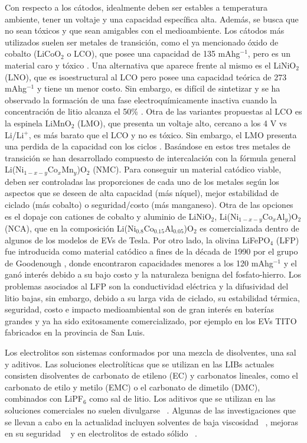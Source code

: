 Con respecto a los cátodos, idealmente deben ser estables a temperatura ambiente,
tener un voltaje y una capacidad específica alta. Además, se busca que no sean 
tóxicos y que sean amigables con el medioambiente. Los cátodos más utilizados 
suelen ser metales de transición, como el ya mencionado óxido de cobalto 
(LiCoO$_2$ o LCO), que posee una capacidad de 135 mAhg$^{-1}$, pero es un
material caro y tóxico \cite{akhilash2021}. Una alternativa que aparece frente
al mismo es el LiNiO$_2$ (LNO), que es isoestructural al LCO pero posee una
capacidad teórica de 273 mAhg$^{-1}$ y tiene un menor costo. Sin embargo, es
difícil de sintetizar y se ha observado la formación de una fase 
electroquímicamente inactiva cuando la concentración de litio alcanza el 50\% 
\cite{bianchini2019}. Otra de las variantes propuestas al LCO es la espinela
LiMnO$_2$ (LMO), que presenta un voltaje alto, cercano a los 4 V vs Li/Li$^+$,
es más barato que el LCO y no es tóxico. Sin embargo, el LMO presenta una 
perdida de la capacidad con los ciclos \cite{bhandari2016}. Basándose en estos 
tres metales de transición se han desarrollado compuesto de intercalación con 
la fórmula general Li(Ni$_{1-x-y}$Co$_x$Mn$_y$)O$_2$ (NMC). Para conseguir un 
material catódico viable, deben ser controladas las proporciones de cada uno de 
los metales según los aspectos que se deseen de alta capacidad (más níquel), 
mejor estabilidad de ciclado (más cobalto) o seguridad/costo (más manganeso). 
Otra de las opciones es el dopaje con cationes de cobalto y aluminio de LiNiO$_2$, 
Li(Ni$_{1-x-y}$Co$_x$Al$_y$)O$_2$ (NCA), que en la composición 
Li(Ni$_{0.8}$Co$_{0.15}$Al$_{0.05}$)O$_2$ \cite{chen2004} es comercializada 
dentro de algunos de los modelos de EVs de Tesla. Por otro lado, la olivina 
LiFePO$_4$ (LFP) fue introducida como material catódico a fines de la década 
de 1990 por el grupo de Goodenough \cite{padhi1997}, donde encontraron capacidades
menores a los 120 mAhg$^{-1}$ y el ganó interés debido a su bajo costo y la 
naturaleza benigna del fosfato-hierro. Los problemas asociados al LFP son la
conductividad eléctrica y la difusividad del litio bajas, sin embargo, debido
a su larga vida de ciclado, su estabilidad térmica, seguridad, costo e impacto 
medioambiental son de gran interés en baterías grandes y ya ha sido exitosamente 
comercializado, por ejemplo en los EVs TITO fabricados en la provincia de San Luis.

Los electrolitos son sistemas conformados por una mezcla de disolventes, una 
sal y aditivos. Las soluciones electrolíticas que se utilizan en las LIBs actuales 
consisten disolventes de carbonato de etileno (EC) y carbonatos lineales, como
el carbonato de etilo y metilo (EMC) o el carbonato de dimetilo (DMC), combinados 
con LiPF$_6$ como sal de litio. Los aditivos que se utilizan en las soluciones 
comerciales no suelen divulgarse ~\cite{schipper2016}. Algunas de las 
investigaciones que se llevan a cabo en la actualidad incluyen solventes de
baja viscosidad ~\cite{logan2020}, mejoras en su seguridad ~\cite{wang2019} 
y en electrolitos de estado sólido ~\cite{zheng2018}.

